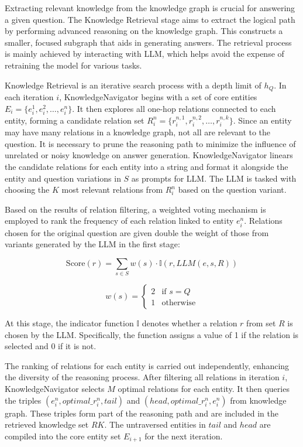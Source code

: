 \documentclass{article}
\begin{document}
Extracting relevant knowledge from the knowledge graph is crucial for answering a given question. The Knowledge Retrieval stage aims to extract the logical path by performing advanced reasoning on the knowledge graph. This constructs a smaller, focused subgraph that aids in generating answers. The retrieval process is mainly achieved by interacting with LLM, which helps avoid the expense of retraining the model for various tasks.

Knowledge Retrieval is an iterative search process with a depth limit of $h_Q$. In each iteration $i$, KnowledgeNavigator begins with a set of core entities $E_i = {\{e^1_i, e^2_i, \ldots, e^n_i\}}$. It then explores all one-hop relations connected to each entity, forming a candidate relation set $R^n_i = \{r^{n,1}_i, r^{n,2}_i, \ldots, r^{n,k}_i\}$. Since an entity may have many relations in a knowledge graph, not all are relevant to the question. It is necessary to prune the reasoning path to minimize the influence of unrelated or noisy knowledge on answer generation. KnowledgeNavigator linears the candidate relations for each entity into a string and format it alongside the entity and question variations in $S$ as prompts for LLM. The LLM is tasked with choosing the $K$ most relevant relations from $R^n_i$ based on the question variant. 


Based on the results of relation filtering, a weighted voting mechanism is employed to rank the frequency of each relation linked to entity $e^n_i$. Relations chosen for the original question are given double the weight of those from variants generated by the LLM in the first stage:

\begin{equation}
    \text{Score}(r) = \sum_{s \in S} w(s) \cdot \mathbb{I}(r, LLM(e, s, R))
\end{equation}

\begin{equation}
    w(s) = \begin{cases}
        2 & \text{if } s = Q \\
        1 & \text{otherwise}
        \end{cases}
\end{equation}

At this stage, the indicator function $\mathbb{I}$ denotes whether a relation $r$ from set $R$ is chosen by the LLM. Specifically, the function assigns a value of 1 if the relation is selected and 0 if it is not.

The ranking of relations for each entity is carried out independently, enhancing the diversity of the reasoning process. After filtering all relations in iteration $i$, KnowledgeNavigator selects $M$ optimal relations for each entity. It then queries the triples $(e^n_i, optimal\_r^n_i, tail)$ and $(head, optimal\_r^n_i, e^n_i)$ from knowledge graph. These triples form part of the reasoning path and are included in the retrieved knowledge set $RK$. The untraversed entities in $tail$ and $head$ are compiled into the core entity set $E_{i+1}$ for the next iteration. 
\end{document}
